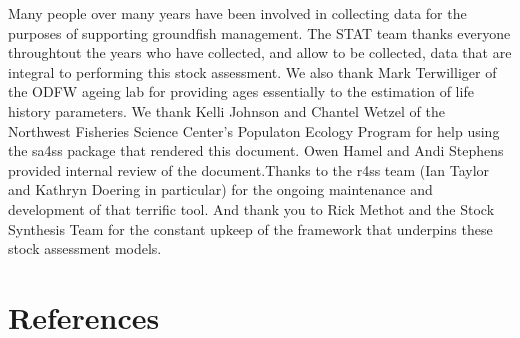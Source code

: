 \documentclass[11pt,
  english,
  a4paper,
]{article}
\begin{document}
Many people over many years have been involved in collecting data for the purposes of supporting groundfish management. The STAT team thanks everyone throughtout the years who have collected, and allow to be collected, data that are integral to performing this stock assessment. We also thank Mark Terwilliger of the ODFW ageing lab for providing ages essentially to the estimation of life history parameters. We thank Kelli Johnson and Chantel Wetzel of the Northwest Fisheries Science Center's Populaton Ecology Program for help using the sa4ss package that rendered this document. Owen Hamel and Andi Stephens provided internal review of the document.Thanks to the r4ss team (Ian Taylor and Kathryn Doering in particular) for the ongoing maintenance and development of that terrific tool. And thank you to Rick Methot and the Stock Synthesis Team for the constant upkeep of the framework that underpins these stock assessment models.

\leavevmode\tagmcend\tagstructend\par

\clearpage


\hypertarget{references}{%
\section{References}\label{references}}

\leavevmode\tagmcend\tagstructend

\end{document}
